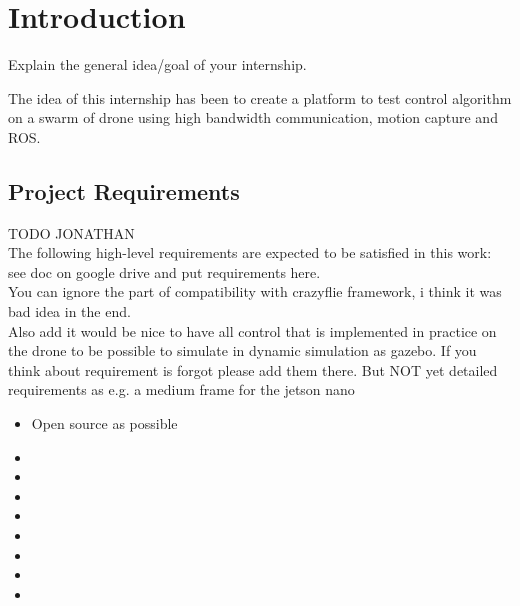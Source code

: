 \chapter{Introduction}
Explain the general idea/goal of your internship.

The idea of this internship has been to create a platform to test control algorithm on a swarm of drone using high bandwidth communication, motion capture and ROS.





\section{Project Requirements}
 {\color{red}TODO JONATHAN\\}
The following high-level requirements are expected to be satisfied in this work: see doc on google drive and put requirements here. \\
You can ignore the part of compatibility with crazyflie framework, i think it was bad idea in the end.\\
Also add it would be nice to have all control that is implemented in practice on the drone to be possible to simulate in dynamic simulation as gazebo. If you think about requirement is forgot please add them there. But NOT yet detailed requirements as e.g. a medium frame for the jetson nano
\begin{itemize}
    \item Open source as possible
    \item
    \item
    \item
    \item
    \item
    \item
    \item
    \item
\end{itemize}
